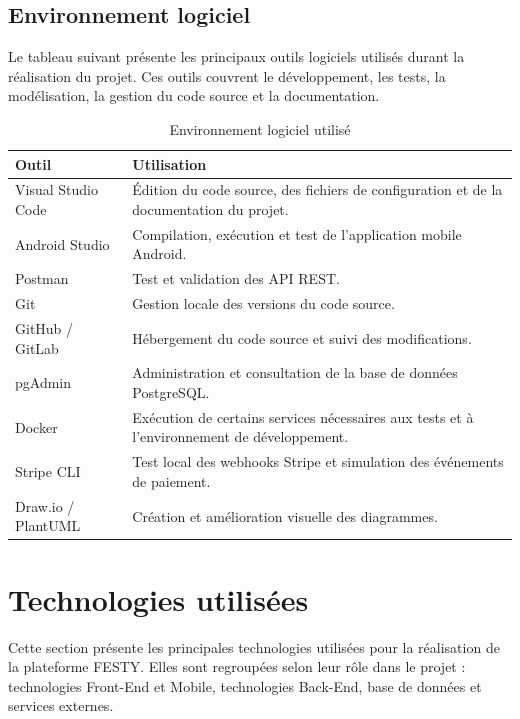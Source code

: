 \subsection{Environnement logiciel}


Le tableau suivant présente les principaux outils logiciels utilisés durant la réalisation du projet. Ces outils couvrent le développement, les tests, la modélisation, la gestion du code source et la documentation.


\begin{table}[H]
\centering
\caption{Environnement logiciel utilisé}
\label{tableau:2-9}
\renewcommand{\arraystretch}{1.2}
\begin{tabularx}{\textwidth}{|>{\raggedright\arraybackslash}X|>{\raggedright\arraybackslash}X|}
\hline
\rowcolor[HTML]{ECF4FF}
\textbf{Outil} & \textbf{Utilisation} \\
\hline
Visual Studio Code & Édition du code source, des fichiers de configuration et de la documentation du projet. \\
\hline
Android Studio & Compilation, exécution et test de l’application mobile Android. \\
\hline
Postman & Test et validation des API REST. \\
\hline
Git & Gestion locale des versions du code source. \\
\hline
GitHub / GitLab & Hébergement du code source et suivi des modifications. \\
\hline
pgAdmin & Administration et consultation de la base de données PostgreSQL. \\
\hline
Docker & Exécution de certains services nécessaires aux tests et à l’environnement de développement. \\
\hline
Stripe CLI & Test local des webhooks Stripe et simulation des événements de paiement. \\
\hline
Draw.io / PlantUML & Création et amélioration visuelle des diagrammes. \\
\hline
\end{tabularx}
\end{table}


\section{Technologies utilisées}


Cette section présente les principales technologies utilisées pour la réalisation de la plateforme FESTY. Elles sont regroupées selon leur rôle dans le projet : technologies Front-End et Mobile, technologies Back-End, base de données et services externes.


